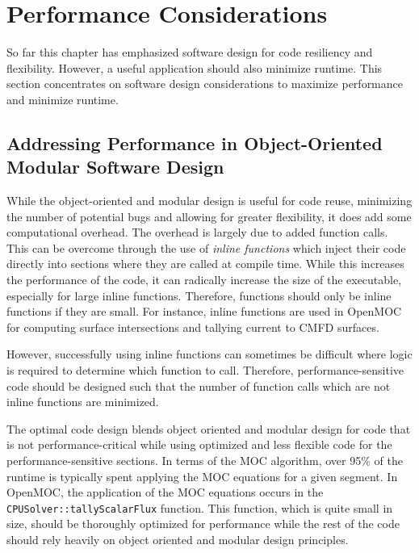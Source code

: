 \section{Performance Considerations}
\label{sec:software-performance-considerations}

So far this chapter has emphasized software design for code resiliency and flexibility. However, a useful application should also minimize runtime. This section concentrates on software design considerations to maximize performance and minimize runtime.

\subsection{Addressing Performance in Object-Oriented Modular Software Design}

While the object-oriented and modular design is useful for code reuse, minimizing the number of potential bugs and allowing for greater flexibility, it does add some computational overhead. The overhead is largely due to added function calls. This can be overcome through the use of \textit{inline functions} which inject their code directly into sections where they are called at compile time. While this increases the performance of the code, it can radically increase the size of the executable, especially for large inline functions. Therefore, functions should only be inline functions if they are small. For instance, inline functions are used in OpenMOC for computing surface intersections and tallying current to CMFD surfaces. 

However, successfully using inline functions can sometimes be difficult where logic is required to determine which function to call. Therefore, performance-sensitive code should be designed such that the number of function calls which are not inline functions are minimized.

The optimal code design blends object oriented and modular design for code that is not performance-critical while using optimized and less flexible code for the performance-sensitive sections. In terms of the \ac{MOC} algorithm, over 95\% of the runtime is typically spent applying the \ac{MOC} equations for a given segment. In OpenMOC, the application of the \ac{MOC} equations occurs in the \texttt{CPUSolver::tallyScalarFlux} function. This function, which is quite small in size, should be thoroughly optimized for performance while the rest of the code should rely heavily on object oriented and modular design principles. 

